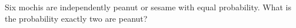 Six mochis are independently peanut or sesame with equal probability. What is the probability exactly two are peanut?
